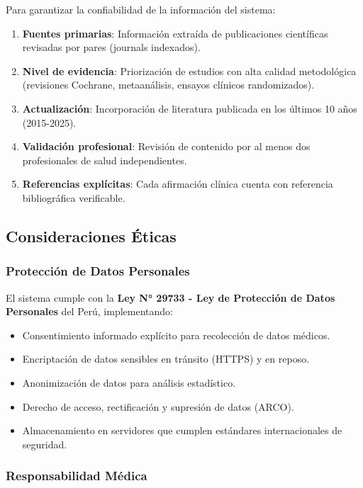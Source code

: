 \documentclass[12pt,a4paper]{article}
\begin{document}
Para garantizar la confiabilidad de la información del sistema:

\begin{enumerate}
    \item \textbf{Fuentes primarias}: Información extraída de publicaciones científicas revisadas por pares (journals indexados).
    \item \textbf{Nivel de evidencia}: Priorización de estudios con alta calidad metodológica (revisiones Cochrane, metaanálisis, ensayos clínicos randomizados).
    \item \textbf{Actualización}: Incorporación de literatura publicada en los últimos 10 años (2015-2025).
    \item \textbf{Validación profesional}: Revisión de contenido por al menos dos profesionales de salud independientes.
    \item \textbf{Referencias explícitas}: Cada afirmación clínica cuenta con referencia bibliográfica verificable.
\end{enumerate}

\subsection{Consideraciones Éticas}

\subsubsection{Protección de Datos Personales}

El sistema cumple con la \textbf{Ley N° 29733 - Ley de Protección de Datos Personales} del Perú, implementando:

\begin{itemize}
    \item Consentimiento informado explícito para recolección de datos médicos.
    \item Encriptación de datos sensibles en tránsito (HTTPS) y en reposo.
    \item Anonimización de datos para análisis estadístico.
    \item Derecho de acceso, rectificación y supresión de datos (ARCO).
    \item Almacenamiento en servidores que cumplen estándares internacionales de seguridad.
\end{itemize}

\subsubsection{Responsabilidad Médica}
\end{document}
